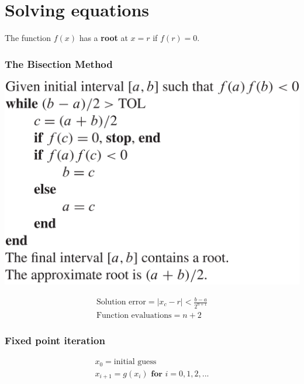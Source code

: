 \section{Solving equations}
\begin{definition}
The function $f(x)$ has a \textbf{root} at $x = r$ if $f(r) = 0$.
\end{definition}

\subsubsection{The Bisection Method}
\includegraphics[scale=0.17]{images/bisection_method.png}

    

\begin{gather*}
\text{Solution error} = |x_c - r| < \frac{b-a}{2^{n+1}} \\
\text{Function evaluations} = n + 2
\end{gather*}
\subsubsection{Fixed point iteration}
\begin{gather*}
x_0 = \text{initial guess} \\
x_{i+1} = g(x_i) \textbf{ for } i = 0,1,2,... \\
\end{gather*}

